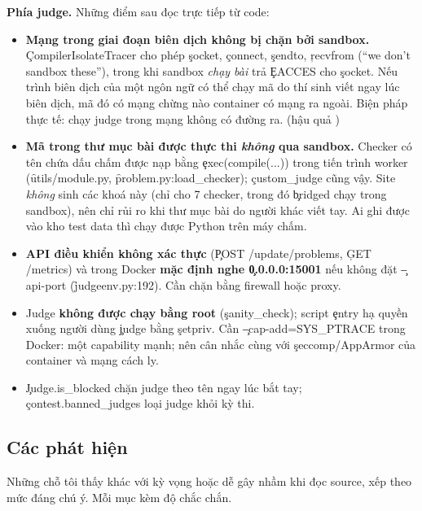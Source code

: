 \textbf{Phía judge.} Những điểm sau đọc trực tiếp từ code:
\begin{itemize}
\item \textbf{Mạng trong giai đoạn biên dịch không bị chặn bởi sandbox.} \c{CompilerIsolateTracer} cho phép \c{socket}, \c{connect}, \c{sendto}, \c{recvfrom} (``we don't sandbox these''), trong khi sandbox \emph{chạy bài} trả \c{EACCES} cho \c{socket}. Nếu trình biên dịch của một ngôn ngữ có thể chạy mã do thí sinh viết ngay lúc biên dịch, mã đó có mạng chừng nào container có mạng ra ngoài. Biện pháp thực tế: chạy judge trong mạng không có đường ra. \tS (hậu quả \tI)
\item \textbf{Mã trong thư mục bài được thực thi \emph{không} qua sandbox.} Checker có tên chứa dấu chấm được nạp bằng \c{exec(compile(...))} trong tiến trình worker (\f{utils/module.py}, \f{problem.py:load_checker}); \c{custom_judge} cũng vậy. Site \emph{không} sinh các khoá này (chỉ cho 7 checker, trong đó \c{bridged} chạy trong sandbox), nên chỉ rủi ro khi thư mục bài do người khác viết tay. Ai ghi được vào kho test data thì chạy được Python trên máy chấm. \tS
\item \textbf{API điều khiển không xác thực} (\c{POST /update/problems}, \c{GET /metrics}) và trong Docker \textbf{mặc định nghe \c{0.0.0.0:15001}} nếu không đặt \c{--api-port} (\f{judgeenv.py:192}). Cần chặn bằng firewall hoặc proxy. \tS
\item Judge \textbf{không được chạy bằng root} (\c{sanity_check}); script \c{entry} hạ quyền xuống người dùng \c{judge} bằng \c{setpriv}. Cần \c{--cap-add=SYS_PTRACE} trong Docker: một capability mạnh; nên cân nhắc cùng với \c{seccomp}/AppArmor của container và mạng cách ly. \tS
\item \c{Judge.is_blocked} chặn judge theo tên ngay lúc bắt tay; \c{contest.banned_judges} loại judge khỏi kỳ thi. \tS
\end{itemize}

\subsection{Các phát hiện}\label{sec:findings}
Những chỗ tôi thấy khác với kỳ vọng hoặc dễ gây nhầm khi đọc source, xếp theo mức đáng chú ý. Mỗi mục kèm độ chắc chắn.



